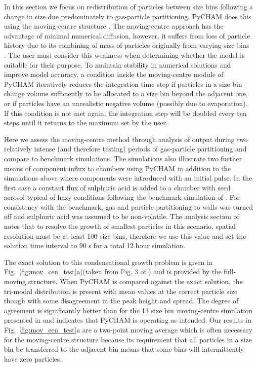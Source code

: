\documentclass[gmd, manuscript]{copernicus}
\begin{document}
In this section we focus on redistribution of particles between size bins following a change in size due predominately to gas-particle partitioning.  PyCHAM does this using the moving-centre structure \citep{Jacobson2005}.  The moving-centre approach has the advantage of minimal numerical diffusion, however, it suffers from loss of particle history due to its combining of mass of particles originally from varying size bins \citep{Zhang1999}.  The user must consider this weakness when determining whether the model is suitable for their purpose.  To maintain stability in numerical solutions and improve model accuracy, a condition inside the moving-centre module of PyCHAM iteratively reduces the integration time step if particles in a size bin change volume sufficiently to be allocated to a size bin beyond the adjacent one, or if particles have an unrealistic negative volume (possibly due to evaporation).  If this condition is not met again, the integration step will be doubled every ten steps until it returns to the maximum set by the user.

Here we assess the moving-centre method through analysis of output during two relatively intense (and therefore testing) periods of gas-particle partitioning and compare to benchmark simulations.  The simulations also illustrate two further means of component influx to chambers using PyCHAM in addition to the simulations above where components were introduced with an initial pulse.  In the first case a constant flux of sulphuric acid is added to a chamber with seed aerosol typical of hazy conditions following the benchmark simulation of \citet{Zhang1999}.  For consistency with the benchmark, gas and particle partitioning to walls was turned off and sulphuric acid was assumed to be non-volatile.  The analysis section of \citet{Zhang1999} notes that to resolve the growth of smallest particles in this scenario, spatial resolution must be at least 100 size bins, therefore we use this value and set the solution time interval to 90 s for a total 12 hour simulation.  

The exact solution to this condensational growth problem is given in Fig.~\ref{fig:mov_cen_test}a)(taken from Fig. 3 of \citet{Zhang1999}) and is provided by the full-moving structure.  When PyCHAM is compared against the exact solution, the tri-modal distribution is present with mean values at the correct particle size though with some disagreement in the peak height and spread.  The degree of agreement is significantly better than for the 13 size bin moving-centre simulation presented in \citet{Zhang1999} and indicates that PyCHAM is operating as intended.  Our results in Fig.~\ref{fig:mov_cen_test}a are a two-point moving average which is often necessary for the moving-centre structure because its requirement that all particles in a size bin be transferred to the adjacent bin means that some bins will intermittently have zero particles.
\end{document}
